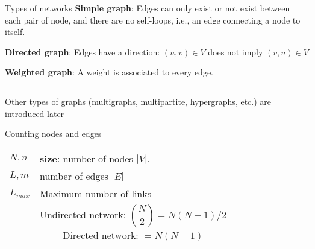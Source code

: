 \begin{textbox}{Types of networks}
    \textbf{Simple graph}: Edges can only exist or not exist between each pair of node, and there are no self-loops, i.e., an edge connecting a node to itself.

    \textbf{Directed graph}: Edges have a direction: $(u,v)\in V$ does not imply $(v,u)\in V$

    \textbf{Weighted graph}: A weight is associated to every edge.

    \noindent\rule{4cm}{0.1pt}

    \tiny{Other types of graphs (multigraphs, multipartite, hypergraphs, etc.) are introduced later}
\end{textbox}


\begin{textbox}{Counting nodes and edges}
    \begin{tabular}{p{}|p{}}\scriptsize
        $N,n$     & \textbf{size}: number of nodes $|V|$. \\
        $L,m$     & number of edges $|E|$                 \\
        $L_{max}$ & Maximum number of links  \\
        \textbf{} & \[  
            \text{Undirected network: } {N\choose 2 }=N(N-1)/2
        \] \\ 
        \textbf{} & \[
            \text{Directed network: }=N(N-1)
        \]
    \end{tabular}
\end{textbox}


